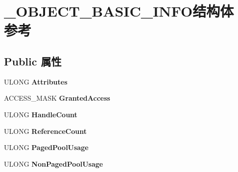 \hypertarget{struct___o_b_j_e_c_t___b_a_s_i_c___i_n_f_o}{}\section{\+\_\+\+O\+B\+J\+E\+C\+T\+\_\+\+B\+A\+S\+I\+C\+\_\+\+I\+N\+F\+O结构体 参考}
\label{struct___o_b_j_e_c_t___b_a_s_i_c___i_n_f_o}
\subsection*{Public 属性}
\begin{DoxyCompactItemize}
\item 
\mbox{\label{struct___o_b_j_e_c_t___b_a_s_i_c___i_n_f_o_a2bec9ab2914aa605e2caa98df0242105}} 
U\+L\+O\+NG {\bfseries Attributes}
\item 
\mbox{\label{struct___o_b_j_e_c_t___b_a_s_i_c___i_n_f_o_a235792a045695a4747a03afafa9110ac}} 
A\+C\+C\+E\+S\+S\+\_\+\+M\+A\+SK {\bfseries Granted\+Access}
\item 
\mbox{\label{struct___o_b_j_e_c_t___b_a_s_i_c___i_n_f_o_a2733832468963e6c884ec61a217a946a}} 
U\+L\+O\+NG {\bfseries Handle\+Count}
\item 
\mbox{\label{struct___o_b_j_e_c_t___b_a_s_i_c___i_n_f_o_a361a9c6d08b4f07f2e14657a07532ef9}} 
U\+L\+O\+NG {\bfseries Reference\+Count}
\item 
\mbox{\label{struct___o_b_j_e_c_t___b_a_s_i_c___i_n_f_o_a452c95b6be25d8698de41201493fd826}} 
U\+L\+O\+NG {\bfseries Paged\+Pool\+Usage}
\item 
\mbox{\label{struct___o_b_j_e_c_t___b_a_s_i_c___i_n_f_o_ad96895d3b32ae53388f2cc7c4467a063}} 
U\+L\+O\+NG {\bfseries Non\+Paged\+Pool\+Usage}
\item 
\mbox{\label{struct___o_b_j_e_c_t___b_a_s_i_c___i_n_f_o_aec4c0f4a0e7c0e2f404cdc0921d09279}} 

\end{DoxyCompactItemize}

